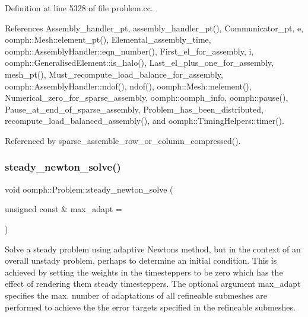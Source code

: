 Definition at line 5328 of file problem.\+cc.



References Assembly\+\_\+handler\+\_\+pt, assembly\+\_\+handler\+\_\+pt(), Communicator\+\_\+pt, e, oomph\+::\+Mesh\+::element\+\_\+pt(), Elemental\+\_\+assembly\+\_\+time, oomph\+::\+Assembly\+Handler\+::eqn\+\_\+number(), First\+\_\+el\+\_\+for\+\_\+assembly, i, oomph\+::\+Generalised\+Element\+::is\+\_\+halo(), Last\+\_\+el\+\_\+plus\+\_\+one\+\_\+for\+\_\+assembly, mesh\+\_\+pt(), Must\+\_\+recompute\+\_\+load\+\_\+balance\+\_\+for\+\_\+assembly, oomph\+::\+Assembly\+Handler\+::ndof(), ndof(), oomph\+::\+Mesh\+::nelement(), Numerical\+\_\+zero\+\_\+for\+\_\+sparse\+\_\+assembly, oomph\+::oomph\+\_\+info, oomph\+::pause(), Pause\+\_\+at\+\_\+end\+\_\+of\+\_\+sparse\+\_\+assembly, Problem\+\_\+has\+\_\+been\+\_\+distributed, recompute\+\_\+load\+\_\+balanced\+\_\+assembly(), and oomph\+::\+Timing\+Helpers\+::timer().



Referenced by sparse\+\_\+assemble\+\_\+row\+\_\+or\+\_\+column\+\_\+compressed().

\mbox{\label{classoomph_1_1Problem_a6de9b126bf5c8fce5d8e9602fa151090}} 
\subsubsection{\texorpdfstring{steady\+\_\+newton\+\_\+solve()}{steady\_newton\_solve()}}
{\footnotesize\ttfamily void oomph\+::\+Problem\+::steady\+\_\+newton\+\_\+solve (\begin{DoxyParamCaption}\item[{unsigned const \&}]{max\+\_\+adapt = {} }\end{DoxyParamCaption})}



Solve a steady problem using adaptive Newton\textquotesingle{}s method, but in the context of an overall unstady problem, perhaps to determine an initial condition. This is achieved by setting the weights in the timesteppers to be zero which has the effect of rendering them steady timesteppers. The optional argument max\+\_\+adapt specifies the max. number of adaptations of all refineable submeshes are performed to achieve the the error targets specified in the refineable submeshes. 

